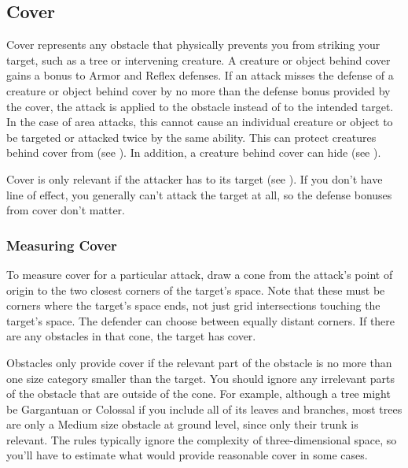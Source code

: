     \subsection{Cover}\label{Cover}

        Cover represents any obstacle that physically prevents you from striking your target, such as a tree or intervening creature.
        A creature or object behind cover gains a  bonus to Armor and Reflex defenses.
        If an attack misses the defense of a creature or object behind cover by no more than the defense bonus provided by the cover,
            the attack is applied to the obstacle instead of to the intended target.
        In the case of area attacks, this cannot cause an individual creature or object to be targeted or attacked twice by the same ability.
        This can protect creatures behind cover from  (see ).
        In addition, a creature behind cover can hide (see ).

        Cover is only relevant if the attacker has  to its target (see ).
        If you don't have line of effect, you generally can't attack the target at all, so the defense bonuses from cover don't matter.

        \subsubsection{Measuring Cover}
            To measure cover for a particular attack, draw a cone from the attack's point of origin to the two closest corners of the target's space.
            Note that these must be corners where the target's space ends, not just grid intersections touching the target's space.
            The defender can choose between equally distant corners.
            If there are any obstacles in that cone, the target has cover.

            Obstacles only provide cover if the relevant part of the obstacle is no more than one size category smaller than the target.
            You should ignore any irrelevant parts of the obstacle that are outside of the cone.
            For example, although a tree might be Gargantuan or Colossal if you include all of its leaves and branches, most trees are only a Medium size obstacle at ground level, since only their trunk is relevant.
            The rules typically ignore the complexity of three-dimensional space, so you'll have to estimate what would provide reasonable cover in some cases.

